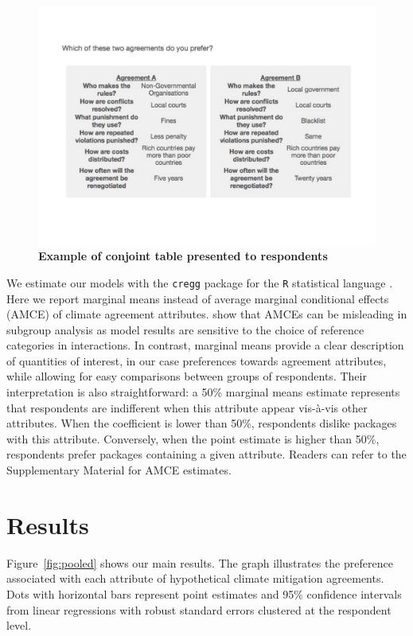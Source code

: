 \documentclass[a4paper,12pt]{article}
\begin{document}
\begin{figure}[H]
	\centering
	\includegraphics[width=13cm]{conjoint-cropped.pdf}
	\caption{\textbf{Example of conjoint table presented to respondents}}
	\label{fig:conjoint}
\end{figure}

We estimate our models with the \texttt{cregg} package \citep{leeper2018cregg} for the \texttt{R} statistical language \citep{rstats2019}. Here we report marginal means instead of average marginal conditional effects (AMCE) of climate agreement attributes. \citet{leeper2018subgroup} show that AMCEs can be misleading in subgroup analysis as model results are sensitive to the choice of reference categories in interactions. In contrast, marginal means provide a clear description of quantities of interest, in our case preferences towards agreement attributes, while allowing for easy comparisons between groups of respondents. Their interpretation is also straightforward: a 50\% marginal means estimate represents that respondents are indifferent when this attribute appear vis-\`{a}-vis other attributes. When the coefficient is lower than 50\%, respondents dislike packages with this attribute. Conversely, when the point estimate is higher than 50\%, respondents prefer packages containing a given attribute. Readers can refer to the Supplementary Material for AMCE estimates.

\section{Results}%
\label{sec:results}

Figure~\ref{fig:pooled} shows our main results. The graph illustrates the preference associated with each attribute of hypothetical climate mitigation agreements. Dots with horizontal bars represent point estimates and 95\% confidence intervals from linear regressions with robust standard errors clustered at the respondent level. \\
\end{document}
